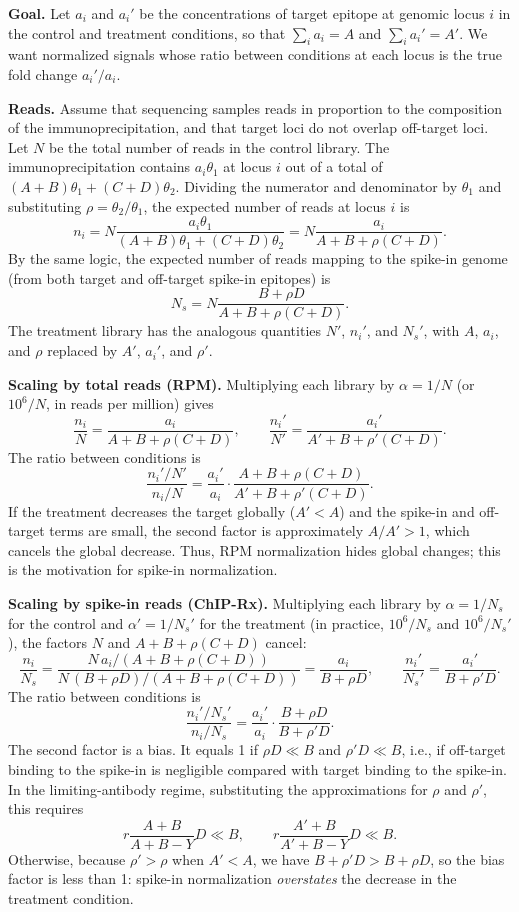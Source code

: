 \documentclass[11pt]{article}
\begin{document}
\textbf{Goal.} Let $a_i$ and $a_i'$ be the concentrations of target
epitope at genomic locus $i$ in the control and treatment conditions,
so that $\sum_i a_i=A$ and $\sum_i a_i'=A'$. We want normalized signals
whose ratio between conditions at each locus is the true fold change
$a_i'/a_i$.

\textbf{Reads.} Assume that sequencing samples reads in proportion to the
composition of the immunoprecipitation, and that target loci do not
overlap off-target loci. Let $N$ be the total number of reads in the
control library. The immunoprecipitation contains $a_i\theta_1$ at locus
$i$ out of a total of $(A+B)\theta_1+(C+D)\theta_2$. Dividing the numerator
and denominator by $\theta_1$ and substituting $\rho=\theta_2/\theta_1$,
the expected number of reads at locus $i$ is
$$
n_i
=N\frac{a_i\theta_1}{(A+B)\theta_1+(C+D)\theta_2}
=N\frac{a_i}{A+B+\rho(C+D)}.
$$
By the same logic, the expected number of reads mapping to the spike-in
genome (from both target and off-target spike-in epitopes) is
$$
N_s
=N\frac{B+\rho D}{A+B+\rho(C+D)}.
$$
The treatment library has the analogous quantities $N'$, $n_i'$, and
$N_s'$, with $A$, $a_i$, and $\rho$ replaced by $A'$, $a_i'$, and $\rho'$.

\textbf{Scaling by total reads (RPM).} Multiplying each library by
$\alpha=1/N$ (or $10^6/N$, in reads per million) gives
$$
\frac{n_i}{N}=\frac{a_i}{A+B+\rho(C+D)},
\qquad
\frac{n_i'}{N'}=\frac{a_i'}{A'+B+\rho'(C+D)}.
$$
The ratio between conditions is
$$
\frac{n_i'/N'}{n_i/N}
=\frac{a_i'}{a_i}\cdot\frac{A+B+\rho(C+D)}{A'+B+\rho'(C+D)}.
$$
If the treatment decreases the target globally ($A'<A$) and the
spike-in and off-target terms are small, the second factor is
approximately $A/A'>1$, which cancels the global decrease. Thus, RPM
normalization hides global changes; this is the motivation for spike-in
normalization.

\textbf{Scaling by spike-in reads (ChIP-Rx).} Multiplying each library by
$\alpha=1/N_s$ for the control and $\alpha'=1/N_s'$ for the treatment (in
practice, $10^6/N_s$ and $10^6/N_s'$), the factors $N$ and
$A+B+\rho(C+D)$ cancel:
$$
\frac{n_i}{N_s}
=\frac{N\,a_i/(A+B+\rho(C+D))}{N\,(B+\rho D)/(A+B+\rho(C+D))}
=\frac{a_i}{B+\rho D},
\qquad
\frac{n_i'}{N_s'}=\frac{a_i'}{B+\rho' D}.
$$
The ratio between conditions is
$$
\frac{n_i'/N_s'}{n_i/N_s}
=\frac{a_i'}{a_i}\cdot\frac{B+\rho D}{B+\rho' D}.
$$
The second factor is a bias. It equals 1 if $\rho D\ll B$ and
$\rho' D\ll B$, i.e., if off-target binding to the spike-in is
negligible compared with target binding to the spike-in. In the
limiting-antibody regime, substituting the approximations for $\rho$ and
$\rho'$, this requires
$$
r\frac{A+B}{A+B-Y}D\ll B,
\qquad
r\frac{A'+B}{A'+B-Y}D\ll B.
$$
Otherwise, because $\rho'>\rho$ when $A'<A$, we have $B+\rho' D>B+\rho D$,
so the bias factor is less than 1: spike-in normalization
\emph{overstates} the decrease in the treatment condition.
\end{document}

